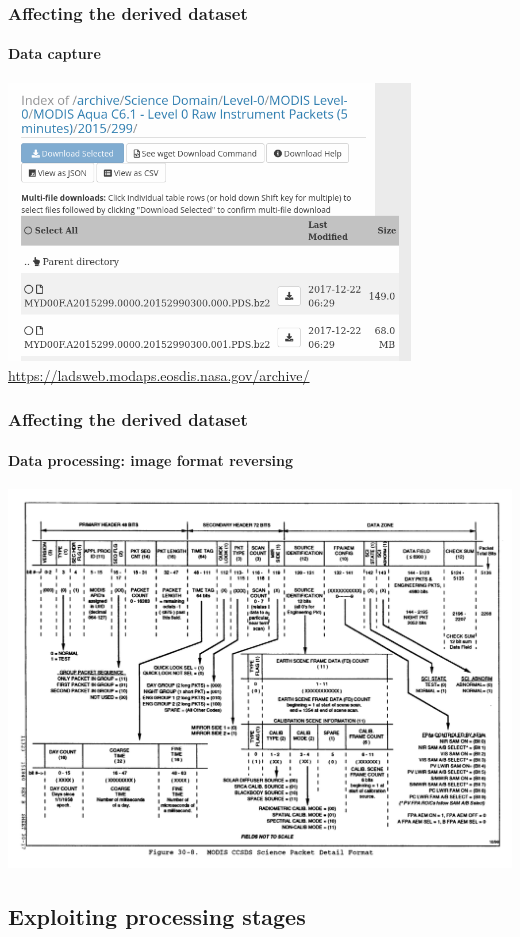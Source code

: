 \documentclass{beamer}
\begin{document}
\begin{frame}
  \frametitle{Affecting the derived dataset}
  \framesubtitle{Data capture}
  \centering
  \includegraphics[width=0.8\textwidth]{images/level0.png}
  \url{https://ladsweb.modaps.eosdis.nasa.gov/archive/}
\end{frame}

\begin{frame}
  \frametitle{Affecting the derived dataset}
  \framesubtitle{Data processing: image format reversing}
  \includegraphics[width=\textwidth]{images/image_format.png}
\end{frame}

\subsection{Exploiting processing stages}
\end{document}
